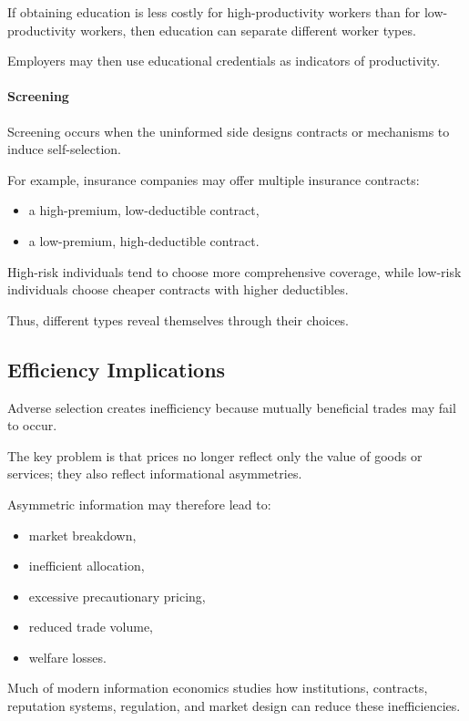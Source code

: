 If obtaining education is less costly for high-productivity workers than for low-productivity workers, then education can separate different worker types.

Employers may then use educational credentials as indicators of productivity.

\paragraph{Screening}

Screening occurs when the uninformed side designs contracts or mechanisms to induce self-selection.

For example, insurance companies may offer multiple insurance contracts:

\begin{itemize}
    \item a high-premium, low-deductible contract,
    \item a low-premium, high-deductible contract.
\end{itemize}

High-risk individuals tend to choose more comprehensive coverage, while low-risk individuals choose cheaper contracts with higher deductibles.

Thus, different types reveal themselves through their choices.

\subsection{Efficiency Implications}

Adverse selection creates inefficiency because mutually beneficial trades may fail to occur.

The key problem is that prices no longer reflect only the value of goods or services; they also reflect informational asymmetries.

Asymmetric information may therefore lead to:

\begin{itemize}
    \item market breakdown,
    \item inefficient allocation,
    \item excessive precautionary pricing,
    \item reduced trade volume,
    \item welfare losses.
\end{itemize}

Much of modern information economics studies how institutions, contracts, reputation systems, regulation, and market design can reduce these inefficiencies.




